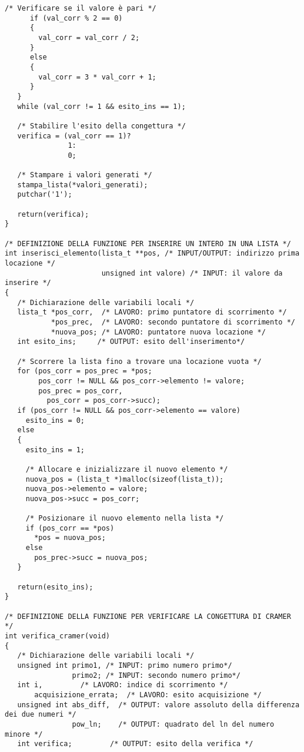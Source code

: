 \documentclass[10pt]{report}
\begin{document}
\begin{lstlisting}[label = {lst:codiceSorgente}]
   	  /* Verificare se il valore è pari */
   	  if (val_corr % 2 == 0)
   	  {  
   	  	val_corr = val_corr / 2;
   	  } 
   	  else 
   	  {   
   	  	val_corr = 3 * val_corr + 1;
   	  }
   } 
   while (val_corr != 1 && esito_ins == 1);

   /* Stabilire l'esito della congettura */
   verifica = (val_corr == 1)? 
               1: 
               0;
   
   /* Stampare i valori generati */
   stampa_lista(*valori_generati);
   putchar('1');

   return(verifica);
}

/* DEFINIZIONE DELLA FUNZIONE PER INSERIRE UN INTERO IN UNA LISTA */
int inserisci_elemento(lista_t **pos, /* INPUT/OUTPUT: indirizzo prima locazione */
                       unsigned int valore) /* INPUT: il valore da inserire */
{   
   /* Dichiarazione delle variabili locali */
   lista_t *pos_corr,  /* LAVORO: primo puntatore di scorrimento */
           *pos_prec,  /* LAVORO: secondo puntatore di scorrimento */
   		   *nuova_pos; /* LAVORO: puntatore nuova locazione */
   int esito_ins;     /* OUTPUT: esito dell'inserimento*/
   
   /* Scorrere la lista fino a trovare una locazione vuota */
   for (pos_corr = pos_prec = *pos; 
        pos_corr != NULL && pos_corr->elemento != valore; 
   	    pos_prec = pos_corr, 
   	      pos_corr = pos_corr->succ);
   if (pos_corr != NULL && pos_corr->elemento == valore)
     esito_ins = 0;
   else
   {
     esito_ins = 1;

     /* Allocare e inizializzare il nuovo elemento */
     nuova_pos = (lista_t *)malloc(sizeof(lista_t));
     nuova_pos->elemento = valore;
     nuova_pos->succ = pos_corr;
     
     /* Posizionare il nuovo elemento nella lista */
     if (pos_corr == *pos)       
       *pos = nuova_pos;
     else
       pos_prec->succ = nuova_pos;
   }

   return(esito_ins);
}

/* DEFINIZIONE DELLA FUNZIONE PER VERIFICARE LA CONGETTURA DI CRAMER */
int verifica_cramer(void)
{   
   /* Dichiarazione delle variabili locali */
   unsigned int primo1, /* INPUT: primo numero primo*/
                primo2; /* INPUT: secondo numero primo*/
   int i,         /* LAVORO: indice di scorrimento */
       acquisizione_errata;  /* LAVORO: esito acquisizione */
   unsigned int abs_diff,  /* OUTPUT: valore assoluto della differenza dei due numeri */
                pow_ln;    /* OUTPUT: quadrato del ln del numero minore */
   int verifica;         /* OUTPUT: esito della verifica */
   

\end{lstlisting}
\end{document}
